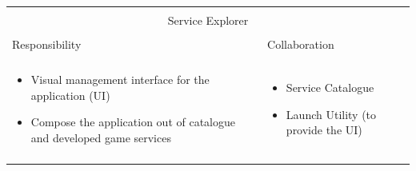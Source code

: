 \vspace{0.5cm} \noindent         
\begin{tabular}{|l|l|}
    \cline{1-2}
    \multicolumn{2}{|c|}{} \\[-0.3cm]
    \multicolumn{2}{|c|}{Service Explorer} \\ 
    \multicolumn{2}{|c|}{} \\[-0.3cm]
    \cline{1-2}
    Responsibility & Collaboration \\
    \cline{1-2}
    & \\[-0.2cm]
    \begin{minipage}{0.47\textwidth}
        \begin{itemize}
          \item Visual management interface for the application (UI)
          \item Compose the application out of catalogue and developed game
          services
        \end{itemize} 
    \end{minipage}
	&
    \begin{minipage}{0.47\textwidth}
        \begin{itemize}
          \item Service Catalogue
          \item Launch Utility (to provide the UI)
        \end{itemize} 
    \end{minipage}
	\\ & \\
    \hline
\end{tabular}

